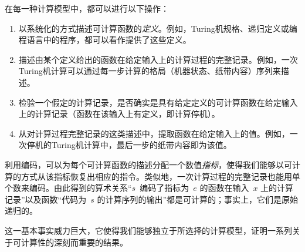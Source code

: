 \documentclass[../../../include/open-logic-section]{subfiles}
\begin{document}

在每一种计算模型中，都可以进行以下操作：

\begin{enumerate}
\item 以系统化的方式描述可计算函数的\emph{定义}。例如，Turing机规格、递归定义或编程语言中的程序，都可以看作提供了这些定义。
\item 描述由某个定义给出的函数在给定输入上的计算过程的完整记录。例如，一次Turing机计算可以通过每一步计算的格局（机器状态、纸带内容）序列来描述。
\item 检验一个假定的计算记录，是否确实是具有给定定义的可计算函数在给定输入上的计算记录（函数在该输入上有定义，即计算停机）。
\item 从对计算过程完整记录的这类描述中，提取函数在给定输入上的值。例如，一次停机的Turing机计算中，最后一步的纸带内容即为该值。
\end{enumerate}

利用编码，可以为每个可计算函数的描述分配一个数值\emph{指标}，使得我们能够以可计算的方式从该指标恢复出相应的指令。类似地，一次计算过程的完整记录也能用单个数来编码。由此得到的算术关系“$s$~编码了指标为~$e$ 的函数在输入~$x$ 上的计算记录”以及函数“代码为~$s$ 的计算序列的输出”都是可计算的；事实上，它们是原始递归的。

这一基本事实威力巨大，它使得我们能够独立于所选择的计算模型，证明一系列关于可计算性的深刻而重要的结果。
\end{document}

